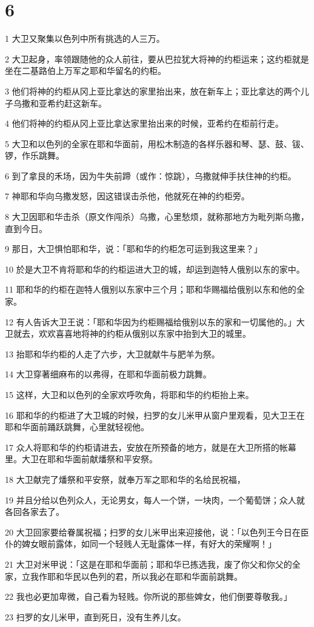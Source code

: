 \chapter{6}

\par 1 大卫又聚集以色列中所有挑选的人三万。
\par 2 大卫起身，率领跟随他的众人前往，要从巴拉犹大将神的约柜运来；这约柜就是坐在二基路伯上万军之耶和华留名的约柜。
\par 3 他们将神的约柜从冈上亚比拿达的家里抬出来，放在新车上；亚比拿达的两个儿子乌撒和亚希约赶这新车。
\par 4 他们将神的约柜从冈上亚比拿达家里抬出来的时候，亚希约在柜前行走。
\par 5 大卫和以色列的全家在耶和华面前，用松木制造的各样乐器和琴、瑟、鼓、钹、锣，作乐跳舞。
\par 6 到了拿艮的禾场，因为牛失前蹄（或作：惊跳），乌撒就伸手扶住神的约柜。
\par 7 神耶和华向乌撒发怒，因这错误击杀他，他就死在神的约柜旁。
\par 8 大卫因耶和华击杀（原文作闯杀）乌撒，心里愁烦，就称那地方为毗列斯乌撒，直到今日。
\par 9 那日，大卫惧怕耶和华，说：「耶和华的约柜怎可运到我这里来？」
\par 10 於是大卫不肯将耶和华的约柜运进大卫的城，却运到迦特人俄别以东的家中。
\par 11 耶和华的约柜在迦特人俄别以东家中三个月；耶和华赐福给俄别以东和他的全家。
\par 12 有人告诉大卫王说：「耶和华因为约柜赐福给俄别以东的家和一切属他的。」大卫就去，欢欢喜喜地将神的约柜从俄别以东家中抬到大卫的城里。
\par 13 抬耶和华约柜的人走了六步，大卫就献牛与肥羊为祭。
\par 14 大卫穿著细麻布的以弗得，在耶和华面前极力跳舞。
\par 15 这样，大卫和以色列的全家欢呼吹角，将耶和华的约柜抬上来。
\par 16 耶和华的约柜进了大卫城的时候，扫罗的女儿米甲从窗户里观看，见大卫王在耶和华面前踊跃跳舞，心里就轻视他。
\par 17 众人将耶和华的约柜请进去，安放在所预备的地方，就是在大卫所搭的帐幕里。大卫在耶和华面前献燔祭和平安祭。
\par 18 大卫献完了燔祭和平安祭，就奉万军之耶和华的名给民祝福，
\par 19 并且分给以色列众人，无论男女，每人一个饼，一块肉，一个葡萄饼；众人就各回各家去了。
\par 20 大卫回家要给眷属祝福；扫罗的女儿米甲出来迎接他，说：「以色列王今日在臣仆的婢女眼前露体，如同一个轻贱人无耻露体一样，有好大的荣耀啊！」
\par 21 大卫对米甲说：「这是在耶和华面前；耶和华已拣选我，废了你父和你父的全家，立我作耶和华民以色列的君，所以我必在耶和华面前跳舞。
\par 22 我也必更加卑微，自己看为轻贱。你所说的那些婢女，他们倒要尊敬我。」
\par 23 扫罗的女儿米甲，直到死日，没有生养儿女。

